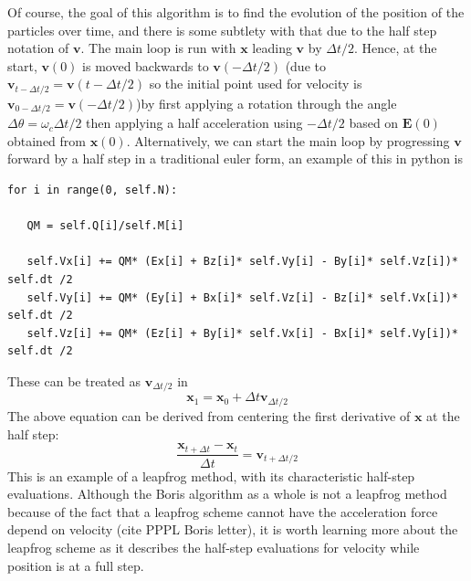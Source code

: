 \documentclass[12pt]{article}
\begin{document}
Of course, the goal of this algorithm is to find the evolution of the position of the particles over time, and there is some subtlety with that due to the half step notation of $\textbf{v}$. The main loop is run with $\textbf{x}$ leading $\textbf{v}$ by $\Delta t/2$. Hence, at the start, $\textbf{v}(0)$ is moved backwards to $\textbf{v}(-\Delta t/2)$ (due to $\textbf{v}_{t-\Delta t/2}=\textbf{v}(t-\Delta t/2)$ so the initial point used for velocity is $\textbf{v}_{0-\Delta t/2}=\textbf{v}(-\Delta t/2)$)by first applying a rotation through the angle $\Delta\theta=\omega_c\Delta t/2$ then applying a half acceleration using $-\Delta t/2$ based on $\textbf{E}(0)$ obtained from $\textbf{x}(0)$. Alternatively, we can start the main loop by progressing $\textbf{v}$ forward by a half step in a traditional euler form, an example of this in python is
\begin{verbatim}
for i in range(0, self.N):
            
   QM = self.Q[i]/self.M[i]
            
   self.Vx[i] += QM* (Ex[i] + Bz[i]* self.Vy[i] - By[i]* self.Vz[i])* self.dt /2
   self.Vy[i] += QM* (Ey[i] + Bx[i]* self.Vz[i] - Bz[i]* self.Vx[i])* self.dt /2
   self.Vz[i] += QM* (Ez[i] + By[i]* self.Vx[i] - Bx[i]* self.Vy[i])* self.dt /2
\end{verbatim}
These can be treated as $\textbf{v}_{\Delta t/2}$ in 
$$\textbf{x}_1=\textbf{x}_0+\Delta t\textbf{v}_{\Delta t/2}$$
The above equation can be derived from centering the first derivative of $\textbf{x}$ at the half step:
\begin{equation}\label{finitevel}
\frac{\textbf{x}_{t+\Delta t}-\textbf{x}_t}{\Delta t}=\textbf{v}_{t+\Delta t/2}
\end{equation}
This is an example of a leapfrog method, with its characteristic half-step evaluations. Although the Boris algorithm as a whole is not a leapfrog method because of the fact that a leapfrog scheme cannot have the acceleration force depend on velocity (cite PPPL Boris letter), it is worth learning more about the leapfrog scheme as it describes the half-step evaluations for velocity while position is at a full step.
\end{document}

